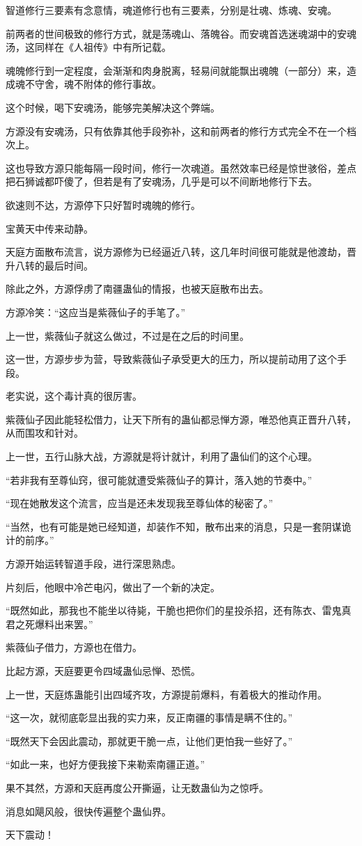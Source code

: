 \begin{this_body}
智道修行三要素有念意情，魂道修行也有三要素，分别是壮魂、炼魂、安魂。

前两者的世间极致的修行方式，就是荡魂山、落魄谷。而安魂首选迷魂湖中的安魂汤，这同样在《人祖传》中有所记载。

魂魄修行到一定程度，会渐渐和肉身脱离，轻易间就能飘出魂魄（一部分）来，造成魂不守舍，魂不附体的修行事故。

这个时候，喝下安魂汤，能够完美解决这个弊端。

方源没有安魂汤，只有依靠其他手段弥补，这和前两者的修行方式完全不在一个档次上。

这也导致方源只能每隔一段时间，修行一次魂道。虽然效率已经是惊世骇俗，差点把石狮诚都吓傻了，但若是有了安魂汤，几乎是可以不间断地修行下去。

欲速则不达，方源停下只好暂时魂魄的修行。

宝黄天中传来动静。

天庭方面散布流言，说方源修为已经逼近八转，这几年时间很可能就是他渡劫，晋升八转的最后时间。

除此之外，方源俘虏了南疆蛊仙的情报，也被天庭散布出去。

方源冷笑：“这应当是紫薇仙子的手笔了。”

上一世，紫薇仙子就这么做过，不过是在之后的时间里。

这一世，方源步步为营，导致紫薇仙子承受更大的压力，所以提前动用了这个手段。

老实说，这个毒计真的很厉害。

紫薇仙子因此能轻松借力，让天下所有的蛊仙都忌惮方源，唯恐他真正晋升八转，从而围攻和针对。

上一世，五行山脉大战，方源就是将计就计，利用了蛊仙们的这个心理。

“若非我有至尊仙窍，很可能就遭受紫薇仙子的算计，落入她的节奏中。”

“现在她散发这个流言，应当是还未发现我至尊仙体的秘密了。”

“当然，也有可能是她已经知道，却装作不知，散布出来的消息，只是一套阴谋诡计的前序。”

方源开始运转智道手段，进行深思熟虑。

片刻后，他眼中冷芒电闪，做出了一个新的决定。

“既然如此，那我也不能坐以待毙，干脆也把你们的星投杀招，还有陈衣、雷鬼真君之死爆料出来罢。”

紫薇仙子借力，方源也在借力。

比起方源，天庭要更令四域蛊仙忌惮、恐慌。

上一世，天庭炼蛊能引出四域齐攻，方源提前爆料，有着极大的推动作用。

“这一次，就彻底彰显出我的实力来，反正南疆的事情是瞒不住的。”

“既然天下会因此震动，那就更干脆一点，让他们更怕我一些好了。”

“如此一来，也好方便我接下来勒索南疆正道。”

果不其然，方源和天庭再度公开撕逼，让无数蛊仙为之惊呼。

消息如飓风般，很快传遍整个蛊仙界。

天下震动！

\end{this_body}

